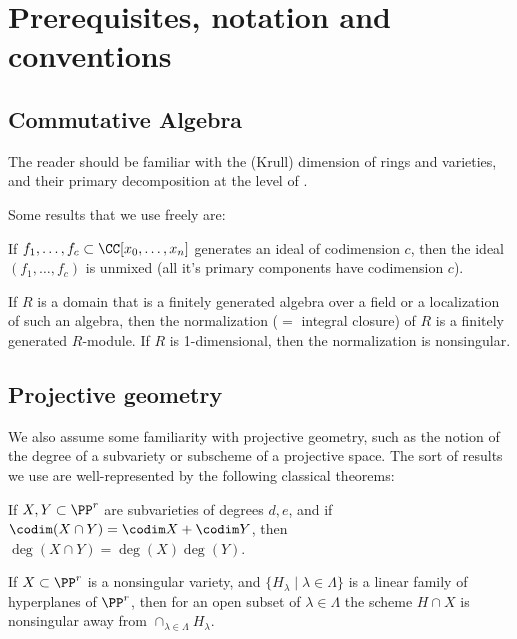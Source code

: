 \section{Prerequisites, notation and conventions}


\subsection{Commutative Algebra}
The reader should be familiar with the (Krull) dimension of rings and varieties, and their primary decomposition at the level of \cite{Atiyah-MacDonald}.

Some results that we use freely are:
 \begin{theorem}\label{Lasker}
If $f_1,\dots, f_c \subset \CC[x_0,\dots, x_n]$ generates an ideal of codimension $c$, then 
the ideal $(f_1,\dots, f_c)$ is unmixed (all it's primary components have codimension $c$).
\end{theorem}

\begin{theorem}\label{finiteness of normalization}
 If $R$ is a domain that is a finitely generated algebra over a field or a localization of such an algebra, then the
normalization ($=$ integral closure) of $R$ is a finitely generated $R$-module.
If $R$ is 1-dimensional, then the normalization is nonsingular.
\end{theorem}




\subsection{Projective geometry}
We also assume some familiarity with projective geometry, such as the notion of the degree of a 
subvariety or subscheme of a projective space. The sort of results we use are
 well-represented by the following classical theorems:

\begin{theorem}
If $X,Y\subset \PP^r$ are subvarieties of degrees $d,e$, and if $\codim(X\cap Y) = \codim X + \codim Y$,
then $\deg (X\cap Y) = \deg(X)\deg(Y)$.
\end{theorem}

\begin{theorem}
If $X\subset \PP^r$  is a nonsingular variety, and $\{H_\lambda \mid \lambda\in \Lambda\}$ is a linear family of hyperplanes of $\PP^r$, then for an open subset of $\lambda\in \Lambda$ the scheme $H\cap X$ is nonsingular away from 
$
\cap_{\lambda \in \Lambda} H_\lambda.
$
\end{theorem}

